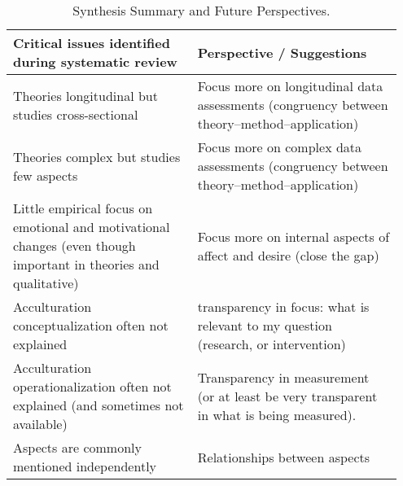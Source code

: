 \begin{table}%
\caption{Synthesis Summary and Future Perspectives.}
\label{tab:SummaryTbl} 
\begin{tabular}{>{\raggedright\arraybackslash}p{0.45\linewidth} 
>{\raggedright\arraybackslash}p{0.50\linewidth}}
\hline 
Critical issues identified during systematic review &
Perspective / Suggestions \\ 
\hline

\vspace{-0.5em} Theories longitudinal but studies cross-sectional & 
\vspace{-0.5em} Focus more on longitudinal data assessments (congruency between theory–method–application)            \\ 

\vspace{-0.5em} Theories complex but studies few aspects & 
\vspace{-0.5em} Focus more on complex data assessments (congruency between theory–method–application)                 \\ 

\vspace{-0.5em} Little empirical focus on emotional and motivational changes (even though important in theories and qualitative) & 
\vspace{-0.5em} Focus more on internal aspects of affect and desire (close the gap)                                   \\ 

\vspace{-0.5em} Acculturation conceptualization often not explained & 
\vspace{-0.5em} transparency in focus: what is relevant to my question (research, or intervention)                    \\ 

\vspace{-0.5em} Acculturation operationalization often not explained (and sometimes not available) & 
\vspace{-0.5em} Transparency in measurement (or at least be very transparent in what is being measured).              \\ 

\vspace{-0.5em} Aspects are commonly mentioned independently & 
\vspace{-0.5em} Relationships between aspects                                                                         \\ 


\end{tabular}
\end{table}
